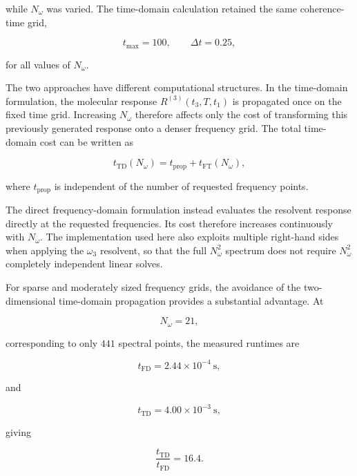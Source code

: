 \documentclass[11pt]{article}
\begin{document}
while $N_\omega$ was varied.  The time-domain calculation retained the
same coherence-time grid,

\begin{equation}
t_{\max}=100,
\qquad
\Delta t=0.25,
\end{equation}

for all values of $N_\omega$.

The two approaches have different computational structures.  In the
time-domain formulation, the molecular response
$R^{(3)}(t_3,T,t_1)$ is propagated once on the fixed time grid.
Increasing $N_\omega$ therefore affects only the cost of transforming
this previously generated response onto a denser frequency grid.  The
total time-domain cost can be written as

\begin{equation}
t_{\mathrm{TD}}(N_\omega)
=
t_{\mathrm{prop}}
+
t_{\mathrm{FT}}(N_\omega),
\end{equation}

where $t_{\mathrm{prop}}$ is independent of the number of requested
frequency points.

The direct frequency-domain formulation instead evaluates the
resolvent response directly at the requested frequencies.  Its cost
therefore increases continuously with $N_\omega$.  The implementation
used here also exploits multiple right-hand sides when applying the
$\omega_3$ resolvent, so that the full $N_\omega^2$ spectrum does not
require $N_\omega^2$ completely independent linear solves.

For sparse and moderately sized frequency grids, the avoidance of the
two-dimensional time-domain propagation provides a substantial
advantage.  At

\begin{equation}
N_\omega=21,
\end{equation}

corresponding to only $441$ spectral points, the measured runtimes are

\begin{equation}
t_{\mathrm{FD}}
=
2.44\times10^{-4}\ \mathrm{s},
\end{equation}

and

\begin{equation}
t_{\mathrm{TD}}
=
4.00\times10^{-3}\ \mathrm{s},
\end{equation}

giving

\begin{equation}
\boxed{
\frac{t_{\mathrm{TD}}}{t_{\mathrm{FD}}}
=
16.4.
}
\end{equation}
\end{document}
